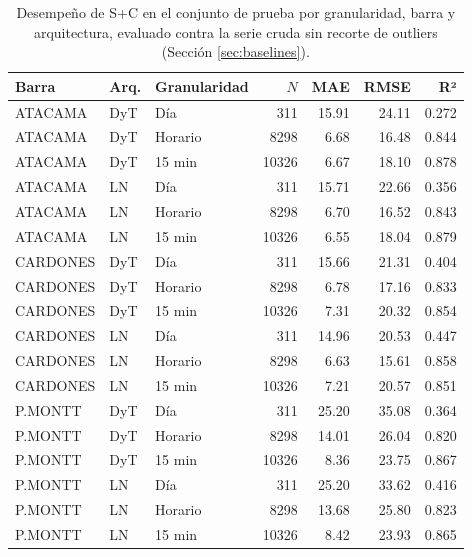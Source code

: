 \begin{table}[htbp]
    \centering
    \small
    \begin{tabular}{lllrrrr}
        \toprule
        Barra & Arq. & Granularidad & $N$ & MAE & RMSE & R² \\
        \midrule
        ATACAMA  & DyT & Día        & 311   & 15.91 & 24.11 & 0.272 \\
        ATACAMA  & DyT & Horario    & 8298  & 6.68  & 16.48 & 0.844 \\
        ATACAMA  & DyT & 15 min     & 10326 & 6.67  & 18.10 & 0.878 \\
        ATACAMA  & LN  & Día        & 311   & 15.71 & 22.66 & 0.356 \\
        ATACAMA  & LN  & Horario    & 8298  & 6.70  & 16.52 & 0.843 \\
        ATACAMA  & LN  & 15 min     & 10326 & 6.55  & 18.04 & 0.879 \\
        CARDONES & DyT & Día        & 311   & 15.66 & 21.31 & 0.404 \\
        CARDONES & DyT & Horario    & 8298  & 6.78  & 17.16 & 0.833 \\
        CARDONES & DyT & 15 min     & 10326 & 7.31  & 20.32 & 0.854 \\
        CARDONES & LN  & Día        & 311   & 14.96 & 20.53 & 0.447 \\
        CARDONES & LN  & Horario    & 8298  & 6.63  & 15.61 & 0.858 \\
        CARDONES & LN  & 15 min     & 10326 & 7.21  & 20.57 & 0.851 \\
        P.MONTT  & DyT & Día        & 311   & 25.20 & 35.08 & 0.364 \\
        P.MONTT  & DyT & Horario    & 8298  & 14.01 & 26.04 & 0.820 \\
        P.MONTT  & DyT & 15 min     & 10326 & 8.36  & 23.75 & 0.867 \\
        P.MONTT  & LN  & Día        & 311   & 25.20 & 33.62 & 0.416 \\
        P.MONTT  & LN  & Horario    & 8298  & 13.68 & 25.80 & 0.823 \\
        P.MONTT  & LN  & 15 min     & 10326 & 8.42  & 23.93 & 0.865 \\
        \bottomrule
    \end{tabular}
    \caption{Desempeño de S+C en el conjunto de prueba por granularidad, barra y arquitectura, evaluado contra la serie cruda sin recorte de outliers (Sección \ref{sec:baselines}).}
    \label{tab:granularidad_metricas}
\end{table}

